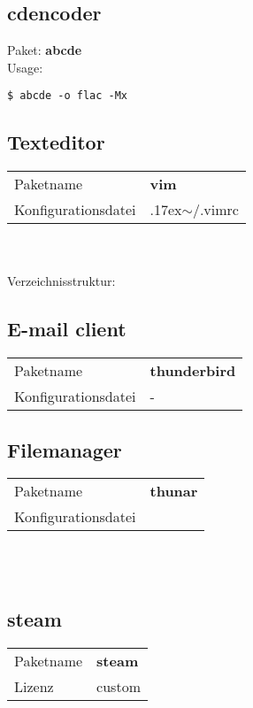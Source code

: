 \subsection{cdencoder}
Paket: \textbf{abcde}  \\ 
Usage:
\begin{lstlisting}[style=Bash]
$ abcde -o flac -Mx
\end{lstlisting}

\subsection{Texteditor}
\begin{tabular}{l|l}
Paketname & \textbf{vim} \\ 
Konfigurationsdatei & {{\raise.17ex\hbox{$\scriptstyle\mathtt{\sim}$}}/.vimrc} \\
\end{tabular}
\\ \\
Verzeichnisstruktur:  

\subsection{E-mail client}
\begin{tabular}{l|l}
Paketname & \textbf{thunderbird} \\ 
Konfigurationsdatei & - \\
\end{tabular}

\subsection{Filemanager}
\begin{tabular}{l|l}
Paketname & \textbf{thunar} \\ 
Konfigurationsdatei & ~ \\
\end{tabular}
\\ \\

\subsection{steam}
\begin{tabular}{l|l}
Paketname & \textbf{steam} \\ 
Lizenz & custom \\
\end{tabular}
\\ \\ \\

